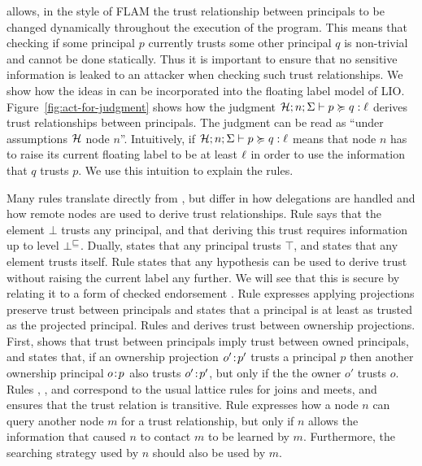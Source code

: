 \lang{} allows, in the style of FLAM \cite{Arden:2015:FA:2859845.2859998} the trust relationship between principals to be changed dynamically throughout the execution of the program. This means that checking if some principal $p$ currently trusts some other principal $q$ is non-trivial and cannot be done statically. Thus it is important to ensure that no sensitive information is leaked to an attacker when checking such trust relationships. We show how the ideas in \cite{Arden:2015:FA:2859845.2859998} can be incorporated into the floating label model of LIO. Figure~\ref{fig:act-for-judgment} shows how the judgment $\mathcal{H}; n; \Sigma \vdash p \succcurlyeq q : \ell$ derives trust relationships between principals. The judgment can be read as ``under assumptions $\mathcal{H}$ node $n$''. Intuitively, if $\mathcal{H}; n; \Sigma \vdash p \succcurlyeq q : \ell$ means that node $n$ has to raise its current floating label to be at least $\ell$ in order to use the information that $q$ trusts $p$. We use this intuition to explain the rules.

Many rules translate directly from \cite{Arden:2015:FA:2859845.2859998}, but differ in how delegations are handled and how remote nodes are used to derive trust relationships. Rule  says that the element $\bot$ trusts any principal, and that deriving this trust requires information up to level $\bot^{\sqsubseteq}$. Dually,  states that any principal trusts $\top$, and  states that any element trusts itself. Rule  states that any hypothesis can be used to derive trust without raising the current label any further. We will see that this is secure by relating it to a form of checked endorsement \cite{Chong:2007:SWA:1294261.1294265}. Rule  expresses applying projections preserve trust between principals and  states that a principal is at least as trusted as the projected principal. Rules  and  derives trust between ownership projections. First,  shows that trust between principals imply trust between owned principals, and  states that, if an ownership projection $o'\!:\!p'$ trusts a principal $p$ then another ownership principal $o\!:\!p$ also trusts $o'\!:\!p'$, but only if the the owner $o'$ trusts $o$. Rules , ,  and  correspond to the usual lattice rules for joins and meets, and  ensures that the trust relation is transitive. Rule  expresses how a node $n$ can query another node $m$ for a trust relationship, but only if $n$ allows the information that caused $n$ to contact $m$ to be learned by $m$. Furthermore, the searching strategy used by $n$ should also be used by $m$.

